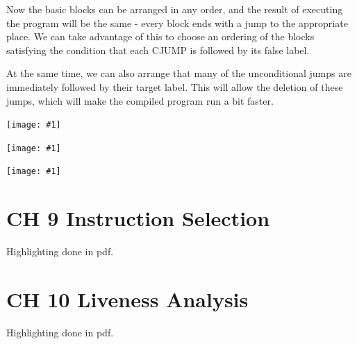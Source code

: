 \documentclass[8pt, a4paper, oneside, twocolumn]{extarticle}
\newcommand{\ph}[1]{
    \texttt{[image: \#1]}
}
\begin{document}
Now the basic blocks can be arranged in any order, and the result of executing
the program will be the same - every block ends with a jump to the 
appropriate place. We can take advantage of this to choose an ordering of the blocks
satisfying the condition that each CJUMP is followed by its false label.

At the same time, we can also arrange that many of the unconditional
jumps are immediately followed by their target label. This will allow the
deletion of these jumps, which will make the compiled program run a bit
faster.

\ph{818}

\ph{819}

\ph{820}

\section{CH 9 Instruction Selection}

Highlighting done in pdf.

\section{CH 10 Liveness Analysis}

Highlighting done in pdf.
\end{document}
